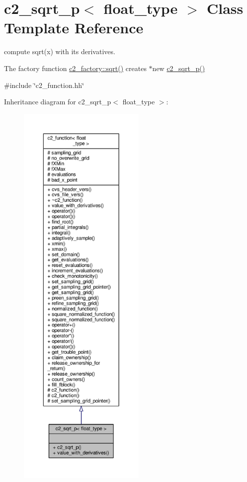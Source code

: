\hypertarget{classc2__sqrt__p}{}\section{c2\+\_\+sqrt\+\_\+p$<$ float\+\_\+type $>$ Class Template Reference}
\label{classc2__sqrt__p}


compute sqrt(x) with its derivatives.

The factory function \hyperlink{classc2__factory_a5b189f66ec65267f3812cdc45ccf072d}{c2\+\_\+factory\+::sqrt()} creates $\ast$new \hyperlink{classc2__sqrt__p_a780a0f48a8fb428b2cb9fac74b7b56e7}{c2\+\_\+sqrt\+\_\+p()}  




{\ttfamily \#include \char`\"{}c2\+\_\+function.\+hh\char`\"{}}



Inheritance diagram for c2\+\_\+sqrt\+\_\+p$<$ float\+\_\+type $>$\+:
\nopagebreak
\begin{figure}[H]
\begin{center}
\leavevmode
\includegraphics[height=550pt]{classc2__sqrt__p__inherit__graph}
\end{center}
\end{figure}


